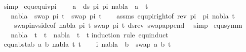 \begin{isabellebody}
\ simp\isanewline
{}\isamarkupfalse%
%
\endisatagproof
{\isafoldproof}%
%
\isadelimproof
\isanewline
%
\endisadelimproof
\isanewline
{}\isamarkupfalse%
\ equ{\isacharunderscore}{\kern0pt}equiv{\isacharunderscore}{\kern0pt}pi{\isacharcolon}{\kern0pt}\ \isanewline
\ \ \ {\isachardoublequoteopen}{\isasymforall}a\ {\isasymin}\ ds\ pi{}\ pi{}{\isachardot}{\kern0pt}\ nabla\ {\isasymturnstile}\ a\ {\isasymsharp}\ t{\isachardoublequoteclose}\isanewline
\ \ \ {\isachardoublequoteopen}nabla\ {\isasymturnstile}\ swap\ pi{}\ t\ {\isasymapprox}\ swap\ pi{}\ t{\isachardoublequoteclose}\isanewline
%
\isadelimproof
\ \ %
\endisadelimproof
%
\isatagproof
{}\isamarkupfalse%
\ assms\ equ{\isacharunderscore}{\kern0pt}pi{\isacharunderscore}{\kern0pt}right{\isacharbrackleft}{\kern0pt}of\ {\isacartoucheopen}rev\ pi{}\ {\isacharat}{\kern0pt}\ pi{}{\isacartoucheclose}\ nabla\ t{\isacharbrackright}{\kern0pt}\isanewline
\ \ \ \ swap{\isacharunderscore}{\kern0pt}inv{\isacharunderscore}{\kern0pt}side{\isacharbrackleft}{\kern0pt}of\ nabla\ pi{}\ t\ {\isacartoucheopen}swap\ pi{}\ t{\isacartoucheclose}{\isacharbrackright}{\kern0pt}\ ds{\isacharunderscore}{\kern0pt}rev\ swap{\isacharunderscore}{\kern0pt}append\ \isamarkupfalse%
\ simp%
\endisatagproof
{\isafoldproof}%
%
\isadelimproof
\isanewline
%
\endisadelimproof
\isanewline
\isanewline
{}\isamarkupfalse%
\ equ{\isacharunderscore}{\kern0pt}symm{\isacharcolon}{\kern0pt}\isanewline
\ \ \ {\isachardoublequoteopen}{\isacharparenleft}{\kern0pt}nabla\ {\isasymturnstile}\ t{}\ {\isasymapprox}\ t{}{\isacharparenright}{\kern0pt}\ {\isasymLongrightarrow}\ {\isacharparenleft}{\kern0pt}nabla\ {\isasymturnstile}\ t{}\ {\isasymapprox}\ t{}{\isacharparenright}{\kern0pt}{\isachardoublequoteclose}\isanewline
%
\isadelimproof
%
\endisadelimproof
%
\isatagproof
{}\isamarkupfalse%
{\isacharparenleft}{\kern0pt}induction\ rule{\isacharcolon}{\kern0pt}\ equ{\isachardot}{\kern0pt}induct{\isacharparenright}{\kern0pt}\isanewline
\ \ \isamarkupfalse%
\ {\isacharparenleft}{\kern0pt}equ{\isacharunderscore}{\kern0pt}abst{\isacharunderscore}{\kern0pt}ab\ a\ b\ nabla\ t{}{\isacharprime}{\kern0pt}\ t{}{\isacharprime}{\kern0pt}{\isacharparenright}{\kern0pt}\isanewline
\ \ \isamarkupfalse%
\ i{\isacharcolon}{\kern0pt}\ {\isachardoublequoteopen}nabla\ {\isasymturnstile}\ b\ {\isasymsharp}\ swap\ {\isacharbrackleft}{\kern0pt}{\isacharparenleft}{\kern0pt}a{\isacharcomma}{\kern0pt}\ b{\isacharparenright}{\kern0pt}{\isacharbrackright}{\kern0pt}\ t{}{\isacharprime}{\kern0pt}{\isachardoublequoteclose}\ \isanewline

\end{isabellebody}
